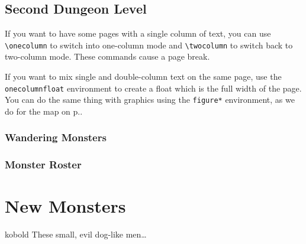 \documentclass[a4paper,serif]{module}
\begin{document}
\begin{onecolumnfloat}[t]
\part{Second Dungeon Level}

If you want to have some pages with a single column of text, you can use \verb|\onecolumn| to switch
into one-column mode and \verb|\twocolumn| to switch back to two-column mode. These commands cause
a page break.

If you want to mix single and double-column text on the same page, use the \verb|onecolumnfloat| environment
to create a float which is the full width of the page. You can do the same thing with graphics using
the \verb|figure*| environment, as we do for the map on p.\pageref{img:map}.

\section*{Wandering Monsters}
\label{wanderingmonsters}

\begin{wanderingmonsters}[b]
\end{wanderingmonsters}

\section*{Monster Roster}

\begin{monsterroster}
\end{monsterroster}
\end{onecolumnfloat}

\lipsum

%
%

\part{New Monsters}

\begin{newmonster}{kobold}
These small, evil dog-like men\ldots
\end{newmonster}
\end{document}
